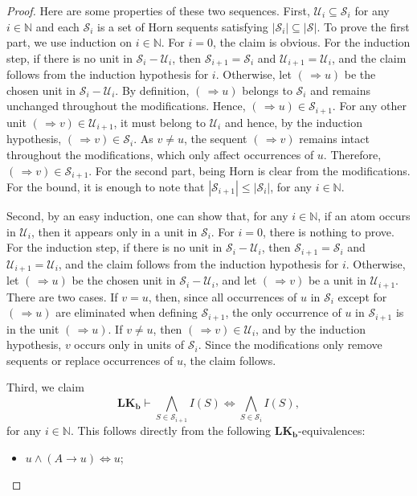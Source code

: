 \documentclass[12pt,a4paper]{article}
\theoremstyle{plain}
\theoremstyle{definition}
\newcommand{\LKb}{\mathbf{LK_b}}
\begin{document}
\begin{proof}
Here are some properties of these two sequences. First,
$\mathcal{U}_i \subseteq \mathcal{S}_i$ for any $i \in \mathbb{N}$ and each $\mathcal{S}_i$ is a set of Horn sequents satisfying $|\mathcal{S}_i|\subseteq |\mathcal{S}|$. To prove the first part, we use induction on $i \in \mathbb{N}$. For $i=0$, the claim is obvious. For the induction step, if there is no unit in $\mathcal{S}_i-\mathcal{U}_i$, then $\mathcal{S}_{i+1}=\mathcal{S}_{i}$ and $\mathcal{U}_{i+1}=\mathcal{U}_i$, and the claim follows from the induction hypothesis for $i$. Otherwise, let $(\, \Rightarrow u)$ be the chosen unit in $\mathcal{S}_i-\mathcal{U}_i$. By definition, $(\, \Rightarrow u)$ belongs to $\mathcal{S}_i$ and remains unchanged throughout the modifications. Hence, $(\, \Rightarrow u) \in \mathcal{S}_{i+1}$. For any other unit $(\, \Rightarrow v) \in \mathcal{U}_{i+1}$, it must belong to $\mathcal{U}_i$ and hence, by the induction hypothesis, $(\, \Rightarrow v) \in \mathcal{S}_i$. As $v \neq u$, the sequent $(\, \Rightarrow v)$ remains intact throughout the modifications, which only affect occurrences of $u$. Therefore, $(\, \Rightarrow v) \in \mathcal{S}_{i+1}$. For the second part, being Horn is clear from the modifications. For the bound, it is enough to note that $|\mathcal{S}_{i+1}| \leq |\mathcal{S}_i|$, for any $i\in \mathbb{N}$. 

Second, by an easy induction, one can show that, for any $i\in\mathbb{N}$, if an atom occurs in $\mathcal{U}_i$, then it appears only in a unit in $\mathcal{S}_i$. For $i=0$, there is nothing to prove. For the induction step, if there is no unit in $\mathcal{S}_i-\mathcal{U}_i$, then $\mathcal{S}_{i+1}=\mathcal{S}_i$ and $\mathcal{U}_{i+1}=\mathcal{U}_i$, and the claim follows from the induction hypothesis for $i$. Otherwise, let $(\,\Rightarrow u)$ be the chosen unit in $\mathcal{S}_i-\mathcal{U}_i$, and let $(\,\Rightarrow v)$ be a unit in $\mathcal{U}_{i+1}$. There are two cases. If $v=u$, then, since all occurrences of $u$ in $\mathcal{S}_i$ except for $(\,\Rightarrow u)$ are eliminated when defining $\mathcal{S}_{i+1}$, the only occurrence of $u$ in $\mathcal{S}_{i+1}$ is in the unit $(\,\Rightarrow u)$. If $v\neq u$, then $(\,\Rightarrow v)\in\mathcal{U}_i$, and by the induction hypothesis, $v$ occurs only in units of $\mathcal{S}_i$. Since the modifications only remove sequents or replace occurrences of $u$, the claim follows.

Third, we claim 
\[
\LKb \vdash
\bigwedge_{S\in\mathcal{S}_{i+1}} I(S)
\Leftrightarrow
\bigwedge_{S\in\mathcal{S}_{i}} I(S),
\]
for any $i\in\mathbb{N}$. This follows directly from the following
$\LKb$-equivalences:
\begin{itemize}
    \item
    $u\wedge(A\to u)\Leftrightarrow u$;
    

\end{itemize}
\end{proof}
\end{document}
